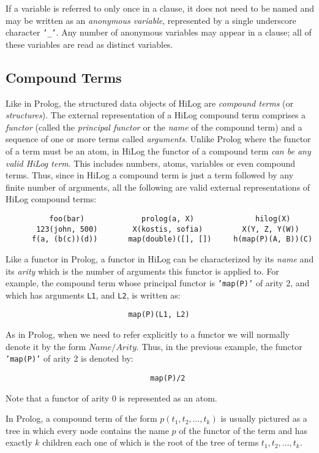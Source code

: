 If a variable is referred to only once in a clause, it does not need
to be named and may be written as an {\em anonymous variable},
represented by a single underscore character {\tt '\_'}.  Any number
of anonymous variables may appear in a clause; all of these variables
are read as distinct variables.  


\subsection{Compound Terms}
Like in Prolog, the structured data objects of HiLog are {\em compound terms}
(or {\em structures}).  The external representation of a HiLog compound term
comprises a {\em functor} (called the {\em principal functor} or the
{\em name} of the compound term) and a sequence of one or more terms called
{\em arguments}.  Unlike Prolog where the functor of a term must be an atom,
in HiLog the functor of a compound term {\em can be any valid HiLog term}.
This includes numbers, atoms, variables or even compound terms.  Thus, since
in HiLog a compound term is just a term followed by any finite number of
arguments, all the following are valid external representations of HiLog
compound terms: 
\label{some_compound_terms}
\begin{verbatim}
          foo(bar)             prolog(a, X)              hilog(X)       
       123(john, 500)        X(kostis, sofia)         X(Y, Z, Y(W))   
      f(a, (b(c))(d))       map(double)([], [])     h(map(P)(A, B))(C)
\end{verbatim}

Like a functor in Prolog, a functor in HiLog can be characterized by
its {\em name} and its {\em arity} which is the number of arguments this
functor is applied to.  For example, the compound term whose principal functor
is {\tt 'map(P)'} of arity 2, and which has arguments {\tt L1}, and {\tt L2},
is written as:
\begin{verbatim}
                            map(P)(L1, L2)
\end{verbatim}

As in Prolog, when we need to refer explicitly to a functor we will normally
denote it by the form $Name/Arity$.  Thus, in the previous example, the functor
{\tt 'map(P)'} of arity 2 is denoted by:
\begin{verbatim}
                                 map(P)/2
\end{verbatim}
Note that a functor of arity 0 is represented as an atom.

In Prolog, a compound term of the form $p(t_1, t_2, \ldots, t_k)$ is usually
pictured as a tree in which every node contains the name $p$ of the functor
of the term and has exactly $k$ children each one of which is the root of the
tree of terms $t_1, t_2, \ldots, t_k$.

